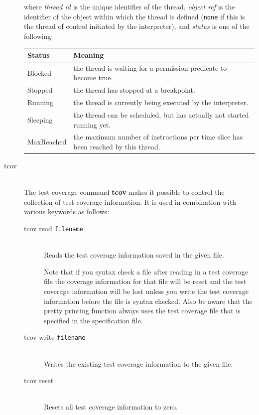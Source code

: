 \documentclass[\pformat,12pt]{article}
\begin{document}
\begin{description}
where \textit{thread id} is the unique identifier of the thread,
\textit{object ref} is the identifier of the object within which the
thread is defined (\texttt{none} if this is the thread of control
initiated by the interpreter), and \textit{status} is one of the
following:

\begin{tabular}{lp{10cm}}\hline
Status & Meaning \\ \hline
Blocked    & the thread is waiting for a permission predicate to
             become true. \\ 
Stopped    & the thread has stopped at a breakpoint.\\
Running    & the thread is currently being executed by the
interpreter. \\
Sleeping   & the thread can be
scheduled, but has actually not started running yet.\\
MaxReached & the maximum number of instructions per time slice has
              been reached by this thread. \\ \hline 
\end{tabular}


\item[tcov]\mbox{}\\
The test coverage command {\bf tcov} makes it possible to control 
the collection of test coverage information. It is used in combination 
with various keywords as follows:

\begin{description}
\item[tcov read \mbox{\texttt{filename}}] \mbox{}\\ 
  Reads the test coverage information saved in the given file.
  
  Note that if you syntax check a file after reading in a test coverage 
  file the coverage information for that file will be reset and the test coverage
  information will be lost unless you  write the test coverage information
  before the file is syntax checked.
  Also be aware that the pretty printing function always uses the test coverage
  file that is specified in the specification file.

\item[tcov write \mbox{\texttt{filename}}] \mbox{} \\ 
  Writes the existing test coverage information to the given file.
  
\item[tcov reset] \mbox{} \\
  Resets all test coverage information to zero.
  
\end{description}


\end{description}
\end{document}
